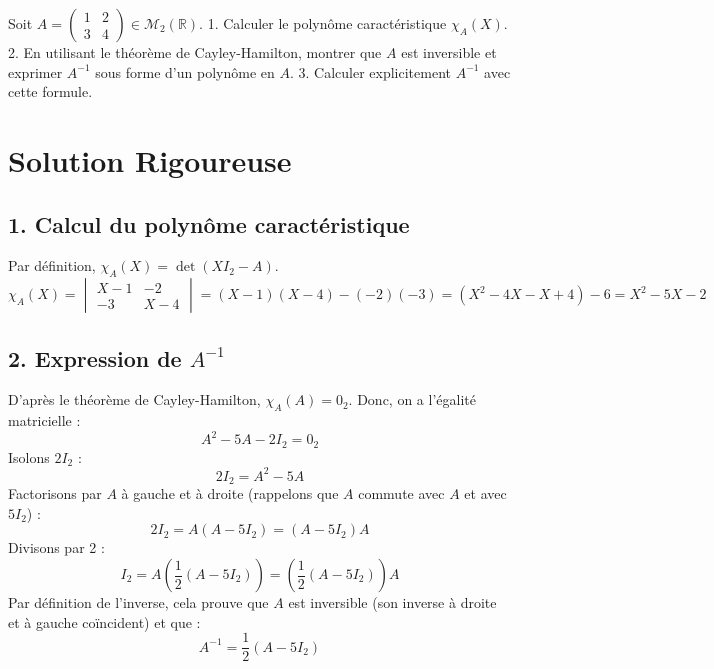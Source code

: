 \documentclass[11pt,a4paper]{article}
\begin{document}
Soit $A = \begin{pmatrix} 1 & 2 \\ 3 & 4 \end{pmatrix} \in \mathcal{M}_2(\mathbb{R})$.
1. Calculer le polynôme caractéristique $\chi_A(X)$.
2. En utilisant le théorème de Cayley-Hamilton, montrer que $A$ est inversible et exprimer $A^{-1}$ sous forme d'un polynôme en $A$.
3. Calculer explicitement $A^{-1}$ avec cette formule.

\section{Solution Rigoureuse}

\subsection{1. Calcul du polynôme caractéristique}
Par définition, $\chi_A(X) = \det(X I_2 - A)$.
$$\chi_A(X) = \begin{vmatrix} X - 1 & -2 \\ -3 & X - 4 \end{vmatrix} = (X - 1)(X - 4) - (-2)(-3) = (X^2 - 4X - X + 4) - 6 = X^2 - 5X - 2$$

\subsection{2. Expression de $A^{-1}$}
D'après le théorème de Cayley-Hamilton, $\chi_A(A) = 0_2$.
Donc, on a l'égalité matricielle :
$$A^2 - 5A - 2I_2 = 0_2$$
Isolons $2I_2$ :
$$2I_2 = A^2 - 5A$$
Factorisons par $A$ à gauche et à droite (rappelons que $A$ commute avec $A$ et avec $5I_2$) :
$$2I_2 = A(A - 5I_2) = (A - 5I_2)A$$
Divisons par 2 :
$$I_2 = A \left( \frac{1}{2}(A - 5I_2) \right) = \left( \frac{1}{2}(A - 5I_2) \right) A$$
Par définition de l'inverse, cela prouve que $A$ est inversible (son inverse à droite et à gauche coïncident) et que :
$$A^{-1} = \frac{1}{2}(A - 5I_2)$$
\end{document}
